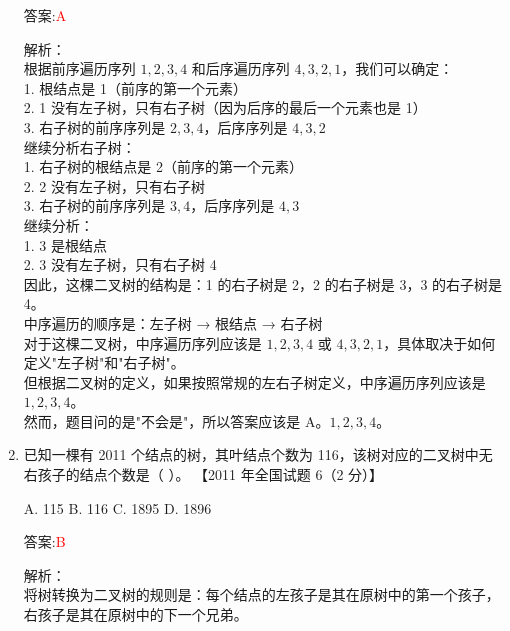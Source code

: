 \documentclass[lang=cn,newtx,10pt,scheme=chinese]{../../../elegantbook}
\begin{document}
\begin{enumerate}
        答案:\textcolor{red}{A}
        
        解析：\\
        根据前序遍历序列 $1, 2, 3, 4$ 和后序遍历序列 $4, 3, 2, 1$，我们可以确定：\\
        1. 根结点是 1（前序的第一个元素）\\
        2. 1 没有左子树，只有右子树（因为后序的最后一个元素也是 1）\\
        3. 右子树的前序序列是 $2, 3, 4$，后序序列是 $4, 3, 2$\\
        
        继续分析右子树：\\
        1. 右子树的根结点是 2（前序的第一个元素）\\
        2. 2 没有左子树，只有右子树\\
        3. 右子树的前序序列是 $3, 4$，后序序列是 $4, 3$\\
        
        继续分析：\\
        1. 3 是根结点\\
        2. 3 没有左子树，只有右子树 4\\
        
        因此，这棵二叉树的结构是：1 的右子树是 2，2 的右子树是 3，3 的右子树是 4。\\
        
        中序遍历的顺序是：左子树 → 根结点 → 右子树\\
        对于这棵二叉树，中序遍历序列应该是 $1, 2, 3, 4$ 或 $4, 3, 2, 1$，具体取决于如何定义"左子树"和"右子树"。\\
        
        但根据二叉树的定义，如果按照常规的左右子树定义，中序遍历序列应该是 $1, 2, 3, 4$。\\
        
        然而，题目问的是"不会是"，所以答案应该是 A。$1, 2, 3, 4$。\\
    
        \item 已知一棵有 2011 个结点的树，其叶结点个数为 116，该树对应的二叉树中无右孩子的结点个数是（ ）。  
        【2011 年全国试题 6（2 分）】  
    
        A. 115 \quad B. 116 \quad C. 1895 \quad D. 1896  
    
        答案:\textcolor{red}{B}
        
        解析：\\
        将树转换为二叉树的规则是：每个结点的左孩子是其在原树中的第一个孩子，右孩子是其在原树中的下一个兄弟。\\
        

\end{enumerate}
\end{document}
